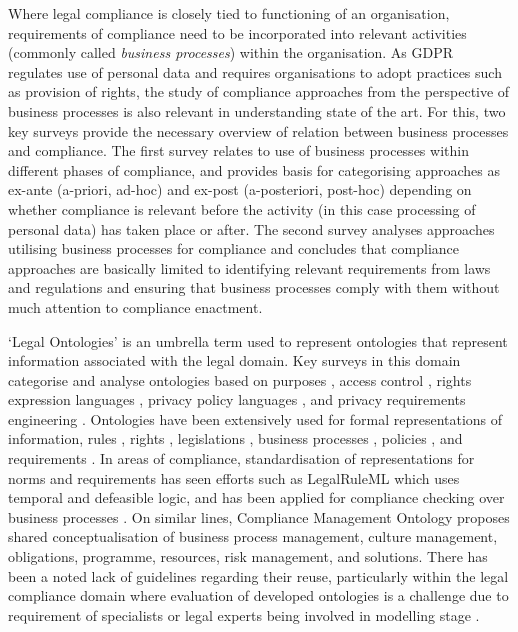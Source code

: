 Where legal compliance is closely tied to functioning of an organisation, requirements of compliance need to be incorporated into relevant activities (commonly called \textit{business processes}) within the organisation.
As GDPR regulates use of personal data and requires organisations to adopt practices such as provision of rights, the study of compliance approaches from the perspective of business processes is also relevant in understanding state of the art. 
For this, two key surveys provide the necessary overview of relation between business processes and compliance. The first survey \cite{fellmann_state---art_2014} relates to use of business processes within different phases of compliance, and provides basis for categorising approaches as ex-ante (a-priori, ad-hoc) and ex-post (a-posteriori, post-hoc) depending on whether compliance is relevant before the activity (in this case processing of personal data) has taken place or after. The second survey \cite{benyoucef_information_2015} analyses approaches utilising business processes for compliance and concludes that compliance approaches are basically limited to identifying relevant requirements from laws and regulations and ensuring that business processes comply with them without much attention to compliance enactment.

`Legal Ontologies' is an umbrella term used to represent ontologies that represent information associated with the legal domain.
Key surveys in this domain categorise and analyse ontologies based on 
purposes \cite{leone_taking_2019,rodrigues_legal_2019}, 
access control \cite{kirrane_access_2016}, 
rights expression languages \cite{pellegrini_genealogy_2018}, 
privacy policy languages \cite{van_de_ven_qualitative_2016}, and
privacy requirements engineering \cite{gharib_ontologies_2016}.
Ontologies have been extensively used for formal representations of information, rules \cite{kirrane_scalable_2018}, rights \cite{pellegrini_genealogy_2018}, legislations \cite{leone_taking_2019}, business processes \cite{elgammal_formalizing_2016}, policies \cite{van_de_ven_qualitative_2016}, and requirements \cite{gharib_ontologies_2016}.
In areas of compliance, standardisation of representations for norms and requirements has seen efforts such as LegalRuleML \cite{palmirani_legalruleml_2011} which uses temporal and defeasible logic, and has been applied for compliance checking over business processes \cite{governatori_semantic_2016}. On similar lines, Compliance Management Ontology \cite{syed_abdullah_compliance_2012} proposes shared conceptualisation of business process management, culture management, obligations, programme, resources, risk management, and solutions.
There has been a noted lack of guidelines regarding their reuse, particularly within the legal compliance domain \cite{casanovas_legal_2017} where evaluation of developed ontologies is a challenge due to requirement of specialists or legal experts being involved in modelling stage \cite{rodrigues_legal_2019}.

